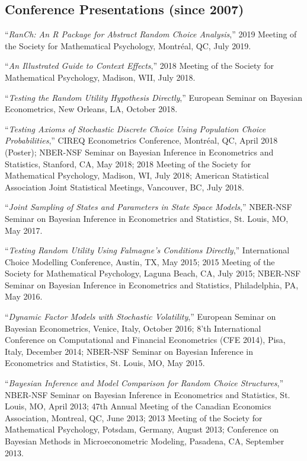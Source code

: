\documentclass[12pt]{article}
\begin{document}
\subsection*{Conference Presentations (since 2007)}
``{\it RanCh: An R Package for Abstract Random Choice Analysis},''
2019 Meeting of the Society for Mathematical Psychology,
Montr\'eal, QC,
July 2019.

``{\it An Illustrated Guide to Context Effects},''
2018 Meeting of the Society for Mathematical Psychology,
Madison, WII,
July 2018.

``{\it Testing the Random Utility Hypothesis Directly},''
European Seminar on Bayesian Econometrics,
New Orleans, LA,
October 2018.

``{\it Testing Axioms of Stochastic Discrete Choice Using Population Choice Probabilities},''
CIREQ Econometrics Conference,
Montr\'eal, QC,
April 2018 (Poster);
NBER-NSF Seminar on Bayesian Inference in Econometrics and Statistics,
Stanford, CA,
May 2018;
2018 Meeting of the Society for Mathematical Psychology,
Madison, WI,
July 2018;
American Statistical Association Joint Statistical Meetings,
Vancouver, BC,
July 2018.

``{\it Joint Sampling of States and Parameters in State Space Models},''
NBER-NSF Seminar on Bayesian Inference in Econometrics and Statistics,
St. Louis, MO,
May 2017.

``{\it Testing Random Utility Using Falmagne's Conditions Directly},''
International Choice Modelling Conference,
Austin, TX,
May 2015;
2015 Meeting of the Society for Mathematical Psychology,
Laguna Beach, CA,
July 2015;
NBER-NSF Seminar on Bayesian Inference in Econometrics and Statistics,
Philadelphia, PA,
May 2016.

``{\it Dynamic Factor Models with Stochastic Volatility},''
European Seminar on Bayesian Econometrics,
Venice, Italy,
October 2016;
8'th International Conference on Computational and Financial Econometrics (CFE 2014),
Pisa, Italy,
December 2014;
NBER-NSF Seminar on Bayesian Inference in Econometrics and Statistics,
St. Louis, MO,
May 2015.

``{\it Bayesian Inference and Model Comparison for Random Choice Structures},''
NBER-NSF Seminar on Bayesian Inference in Econometrics and Statistics,
St. Louis, MO,
April 2013;
47th Annual Meeting of the Canadian Economics Association,
Montreal, QC,
June 2013;
2013 Meeting of the Society for Mathematical Psychology,
Potsdam, Germany,
August 2013;
Conference on Bayesian Methods in Microeconometric Modeling,
Pasadena, CA,
September 2013.
\end{document}
